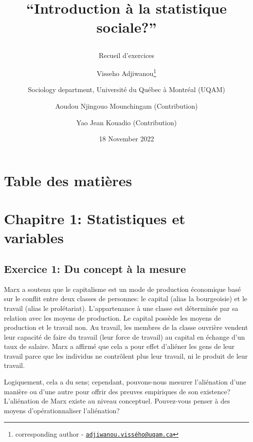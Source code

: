 \documentclass[
]{article}
\title{\vspace{3.5in}

``Introduction à la statistique sociale?''}
\subtitle{Recueil d'exercices}
\author{Visseho Adjiwanou\footnote{corresponding author -
  \href{mailto:adjiwanou.vissého@uqam.ca}{\nolinkurl{adjiwanou.vissého@uqam.ca}}} \and Sociology
department, Université du Québec à Montréal (UQAM) \and Aoudou Njingouo
Mounchingam (Contribution) \and Yao Jean Kouadio (Contribution)}
\date{18 November 2022}
\begin{document}
\maketitle

\newpage 
\tableofcontents 
\listoffigures
\listoftables
\newpage

\hypertarget{table-des-matiuxe8res}{%
\section{Table des matières}\label{table-des-matiuxe8res}}

\hypertarget{chapitre-1-statistiques-et-variables}{%
\section{Chapitre 1: Statistiques et
variables}\label{chapitre-1-statistiques-et-variables}}

\hypertarget{exercice-1-du-concept-uxe0-la-mesure}{%
\subsection{Exercice 1: Du concept à la
mesure}\label{exercice-1-du-concept-uxe0-la-mesure}}

Marx a soutenu que le capitalisme est un mode de production économique
basé sur le conflit entre deux classes de personnes: le capital (alias
la bourgeoisie) et le travail (alias le prolétariat). L'appartenance à
une classe est déterminée par sa relation avec les moyens de production.
Le capital possède les moyens de production et le travail non. Au
travail, les membres de la classe ouvrière vendent leur capacité de
faire du travail (leur force de travail) au capital en échange d'un taux
de salaire. Marx a affirmé que cela a pour effet d'aliéner les gens de
leur travail parce que les individus ne contrôlent plus leur travail, ni
le produit de leur travail.

Logiquement, cela a du sens; cependant, pouvons-nous mesurer
l'aliénation d'une manière ou d'une autre pour offrir des preuves
empiriques de son existence? L'aliénation de Marx existe au niveau
conceptuel. Pouvez-vous penser à des moyens d'opérationnaliser
l'aliénation?
\end{document}
